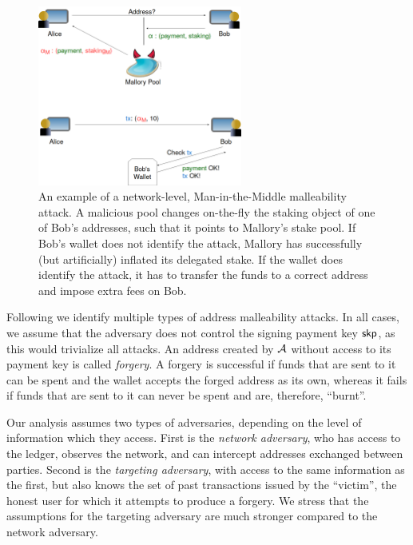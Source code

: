 \begin{figure}
  \begin{center}
    \includegraphics[width=0.6\textwidth]{figures/delegation/malleability_attack.png}
  \end{center}
  \caption{
      An example of a network-level, Man-in-the-Middle malleability attack. A
      malicious pool changes on-the-fly the staking object of one of Bob's
      addresses, such that it points to Mallory's stake pool. If Bob's wallet
      does not identify the attack, Mallory has successfully (but artificially)
      inflated its delegated stake. If the wallet does identify the attack, it
      has to transfer the funds to a correct address and impose extra fees on
      Bob.
    }
  \label{fig:malleability_attack}
\end{figure}

Following we identify multiple types of address malleability attacks. In all
cases, we assume that the adversary does not control the signing payment key
$\mathsf{skp}$, as this would trivialize all attacks. An address created by
$\mathcal{A}$ without access to its payment key is called \emph{forgery}. A
forgery is successful if funds that are sent to it can be spent and the wallet
accepts the forged address as its own, whereas it fails if funds that are sent
to it can never be spent and are, therefore, ``burnt''.

Our analysis assumes two types of adversaries, depending on the level of
information which they access. First is the \emph{network adversary}, who has
access to the ledger, observes the network, and can intercept addresses
exchanged between parties. Second is the \emph{targeting adversary}, with
access to the same information as the first, but also knows the set of past
transactions issued by the ``victim'', \ie the honest user for which it
attempts to produce a forgery. We stress that the assumptions for the targeting
adversary are much stronger compared to the network adversary.

